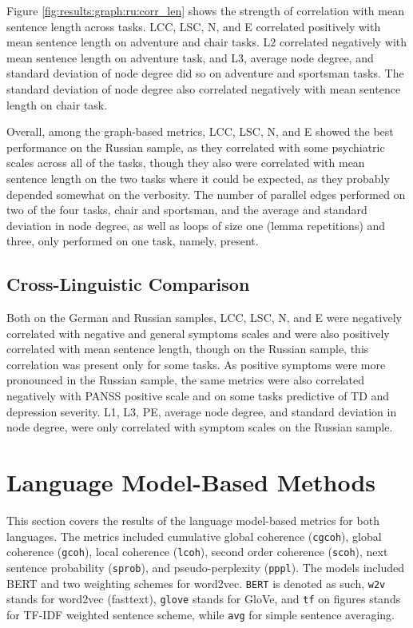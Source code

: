 Figure \ref{fig:results:graph:ru:corr_len} shows the strength of correlation with mean sentence length across tasks. 
LCC, LSC, N, and E correlated positively with mean sentence length on adventure and chair tasks. L2 correlated negatively with mean sentence length on adventure task, and L3, average node degree, and standard deviation of node degree did so on adventure and sportsman tasks. The standard deviation of node degree also correlated negatively with mean sentence length on chair task.

Overall, among the graph-based metrics, LCC, LSC, N, and E showed the best performance on the Russian sample, as they correlated with some psychiatric scales across all of the tasks, though they also were correlated with mean sentence length on the two tasks where it could be expected, as they probably depended somewhat on the verbosity. The number of parallel edges performed on two of the four tasks, chair and sportsman, and the average and standard deviation in node degree, as well as loops of size one (lemma repetitions) and three, only performed on one task, namely, present.

\subsection{Cross-Linguistic Comparison}

Both on the German and Russian samples, LCC, LSC, N, and E were negatively correlated with negative and general symptoms scales and were also positively correlated with mean sentence length, though on the Russian sample, this correlation was present only for some tasks. As positive symptoms were more pronounced in the Russian sample, the same metrics were also correlated negatively with PANSS positive scale and on some tasks predictive of TD and depression severity. L1, L3, PE, average node degree, and standard deviation in node degree, were only correlated with symptom scales on the Russian sample.

\clearpage
\section{Language Model-Based Methods}
\label{sec:results:clinical:LM}

This section covers the results of the language model-based metrics for both languages. The metrics included cumulative global coherence (\texttt{cgcoh}), global coherence (\texttt{gcoh}), local coherence (\texttt{lcoh}), second order coherence (\texttt{scoh}), next sentence probability (\texttt{sprob}), and pseudo-perplexity (\texttt{pppl}). The models included BERT and two weighting schemes for word2vec. \texttt{BERT} is denoted as such, \texttt{w2v} stands for word2vec (fasttext), \texttt{glove} stands for GloVe, and \texttt{tf} on figures stands for TF-IDF weighted sentence scheme, while \texttt{avg} for simple sentence averaging. 

